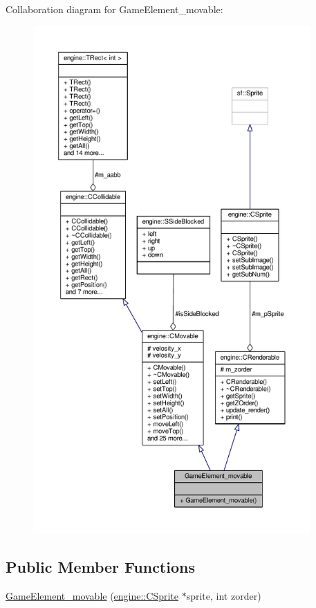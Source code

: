 Collaboration diagram for Game\-Element\-\_\-movable\-:
\nopagebreak
\begin{figure}[H]
\begin{center}
\leavevmode
\includegraphics[height=550pt]{classGameElement__movable__coll__graph}
\end{center}
\end{figure}
\subsection*{Public Member Functions}
\begin{DoxyCompactItemize}
\item 
\hyperlink{classGameElement__movable_a81cdc891c2224ef28b0249dd6549b9b2}{Game\-Element\-\_\-movable} (\hyperlink{classengine_1_1CSprite}{engine\-::\-C\-Sprite} $\ast$sprite, int zorder)
\end{DoxyCompactItemize}
